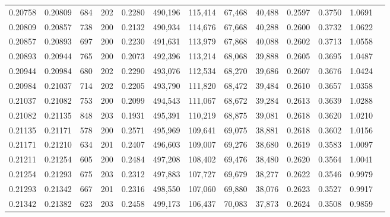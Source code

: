 \begin{tabular}{rrrrrrrrrrrrr}
0.20758 & 0.20809 &   684 & 202 &                                     0.2280 & 490,196 & 115,414 &  67,468 &  40,488 & 0.2597 & 0.3750 & 1.0691 \\
0.20809 & 0.20857 &   738 & 200 &                                     0.2132 & 490,934 & 114,676 &  67,668 &  40,288 & 0.2600 & 0.3732 & 1.0622 \\
0.20857 & 0.20893 &   697 & 200 &                                     0.2230 & 491,631 & 113,979 &  67,868 &  40,088 & 0.2602 & 0.3713 & 1.0558 \\
0.20893 & 0.20944 &   765 & 200 &                                     0.2073 & 492,396 & 113,214 &  68,068 &  39,888 & 0.2605 & 0.3695 & 1.0487 \\
0.20944 & 0.20984 &   680 & 202 &                                     0.2290 & 493,076 & 112,534 &  68,270 &  39,686 & 0.2607 & 0.3676 & 1.0424 \\
0.20984 & 0.21037 &   714 & 202 &                                     0.2205 & 493,790 & 111,820 &  68,472 &  39,484 & 0.2610 & 0.3657 & 1.0358 \\
0.21037 & 0.21082 &   753 & 200 &                                     0.2099 & 494,543 & 111,067 &  68,672 &  39,284 & 0.2613 & 0.3639 & 1.0288 \\
0.21082 & 0.21135 &   848 & 203 &                                     0.1931 & 495,391 & 110,219 &  68,875 &  39,081 & 0.2618 & 0.3620 & 1.0210 \\
0.21135 & 0.21171 &   578 & 200 &                                     0.2571 & 495,969 & 109,641 &  69,075 &  38,881 & 0.2618 & 0.3602 & 1.0156 \\
0.21171 & 0.21210 &   634 & 201 &                                     0.2407 & 496,603 & 109,007 &  69,276 &  38,680 & 0.2619 & 0.3583 & 1.0097 \\
0.21211 & 0.21254 &   605 & 200 &                                     0.2484 & 497,208 & 108,402 &  69,476 &  38,480 & 0.2620 & 0.3564 & 1.0041 \\
0.21254 & 0.21293 &   675 & 203 &                                     0.2312 & 497,883 & 107,727 &  69,679 &  38,277 & 0.2622 & 0.3546 & 0.9979 \\
0.21293 & 0.21342 &   667 & 201 &                                     0.2316 & 498,550 & 107,060 &  69,880 &  38,076 & 0.2623 & 0.3527 & 0.9917 \\
0.21342 & 0.21382 &   623 & 203 &                                     0.2458 & 499,173 & 106,437 &  70,083 &  37,873 & 0.2624 & 0.3508 & 0.9859 \\

\end{tabular}
